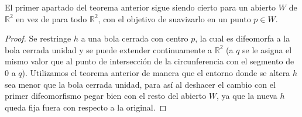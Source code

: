 \begin{corolario}
	El primer apartado del teorema anterior sigue siendo cierto para un abierto $W$ de $\mathbb{R}^2$ en vez de para todo $\mathbb{R}^2$, con el objetivo de suavizarlo en un punto $p \in W$.
\end{corolario}

\begin{proof}
	Se restringe $h$ a una bola cerrada con centro $p$, la cual es difeomorfa a la bola cerrada unidad y se puede extender continuamente a $\mathbb{R}^2$ (a $q$ se le asigna el mismo valor que al punto de intersección de la circunferencia con el segmento de $0$ a $q$). Utilizamos el teorema anterior de manera que el entorno donde se altera $h$ sea menor que la bola cerrada unidad, para así al deshacer el cambio con el primer difeomorfismo pegar bien con el resto del abierto $W$, ya que la nueva $h$ queda fija fuera con respecto a la original.
\end{proof}



\endinput
